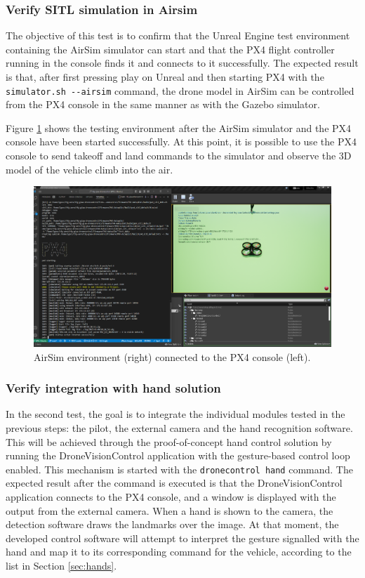 \subsubsection{Verify SITL simulation in Airsim}

The objective of this test is to confirm that the Unreal Engine test environment containing the AirSim simulator can start and that the PX4 flight controller running in the console finds it and connects to it successfully. The expected result is that, after first pressing play on Unreal and then starting PX4 with the \texttt{simulator.sh -{}-airsim} command, the drone model in AirSim can be controlled from the PX4 console in the same manner as with the Gazebo simulator.

Figure \ref{fig:airsim-sitl} shows the testing environment after the AirSim simulator and the PX4 console have been started successfully.
At this point, it is possible to use the PX4 console to send takeoff and land commands to the simulator and observe the 3D model of the vehicle climb into the air.

\begin{figure}
  \centering
  \includegraphics[width=\textwidth, keepaspectratio]{img/airsim-sitl.png}
  \caption{AirSim environment (right) connected to the PX4 console (left).}
  \label{fig:airsim-sitl}
\end{figure}


\subsubsection{Verify integration with hand solution}

In the second test, the goal is to integrate the individual modules tested in the previous steps: the pilot, the external camera and the hand recognition software. This will be achieved through the proof-of-concept hand control solution by running the DroneVisionControl application with the gesture-based control loop enabled. This mechanism is started with the \texttt{dronecontrol hand} command. The expected result after the command is executed is that the DroneVisionControl application connects to the PX4 console, and a window is displayed with the output from the external camera. When a hand is shown to the camera, the detection software draws the landmarks over the image. At that moment, the developed control software will attempt to interpret the gesture signalled with the hand and map it to its corresponding command for the vehicle, according to the list in Section \ref{sec:hands}.

